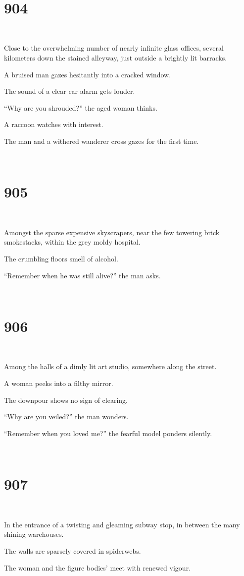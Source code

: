 \documentclass{report}
\begin{document}
~
\chapter*{904}
~

Close to the overwhelming number of nearly infinite glass offices, several kilometers down the stained alleyway, just outside a brightly lit barracks.

A bruised man gazes hesitantly into a cracked window.

The sound of a clear car alarm gets louder.

``Why are you shrouded?'' the aged woman thinks.

A raccoon watches with interest.

The man and a withered wanderer cross gazes for the first time.

~
\chapter*{905}
~

Amongst the sparse expensive skyscrapers, near the few towering brick smokestacks, within the grey moldy hospital.

The crumbling floors smell of alcohol.

``Remember when he was still alive?'' the man asks.

~
\chapter*{906}
~

Among the halls of a dimly lit art studio, somewhere along the street.

A woman peeks into a filthy mirror.

The downpour shows no sign of clearing.

``Why are you veiled?'' the man wonders.

``Remember when you loved me?'' the fearful model ponders silently.

~
\chapter*{907}
~

In the entrance of a twisting and gleaming subway stop, in between the many shining warehouses.

The walls are sparsely covered in spiderwebs.

The woman and the figure bodies' meet with renewed vigour.
\end{document}

